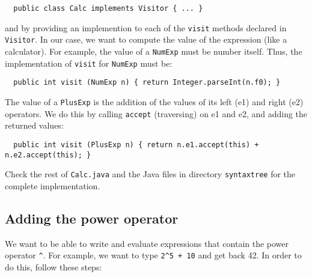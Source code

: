\documentclass{article}
\begin{document}
\begin{itemize}
\begin{verbatim}
  public class Calc implements Visitor { ... }
\end{verbatim}

and by providing an implemention to each of the {\tt visit} methods declared in {\tt Visitor}. In our case, we want to compute the value of the expression (like a calculator). For example, the value of a {\tt NumExp} must be number itself. Thus, the implementation of {\tt visit} for {\tt NumExp} must be:

\begin{verbatim}
  public int visit (NumExp n) { return Integer.parseInt(n.f0); }
\end{verbatim}

The value of a {\tt PlusExp} is the addition of the values of its left (e1) and right (e2) operators. We do this by calling {\tt accept} (traversing) on e1 and e2, and adding the returned values:

\begin{verbatim}
  public int visit (PlusExp n) { return n.e1.accept(this) + n.e2.accept(this); }
\end{verbatim}


\end{itemize}

Check the rest of {\tt Calc.java} and the Java files in directory {\tt syntaxtree}  for the complete implementation.



\subsection*{Adding the power operator}

We want to be able to write and evaluate expressions that contain the power operator \verb+^+. For example, we want to type \verb?2^5 + 10? and get back 42.
In order to do this, follow these steps:
\end{document}

